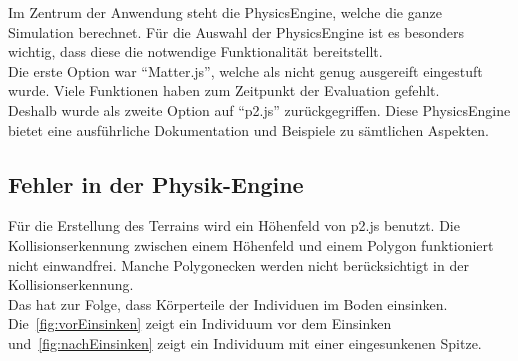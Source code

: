       Im Zentrum der Anwendung steht die \gls{PhysicsEngine}, welche die ganze Simulation berechnet.
      Für die Auswahl der \gls{PhysicsEngine} ist es besonders wichtig,
      dass diese die notwendige Funktionalität bereitstellt.
      \\
      Die erste Option war ``Matter.js'', welche als nicht genug ausgereift eingestuft wurde.
      Viele Funktionen haben zum Zeitpunkt der Evaluation gefehlt.
      \\
      Deshalb wurde als zweite Option auf ``p2.js'' zurückgegriffen.
      Diese \gls{PhysicsEngine} bietet eine ausführliche Dokumentation und Beispiele zu sämtlichen Aspekten.

    \subsection{Fehler in der Physik-Engine\label{sub:fehler}}

      Für die Erstellung des Terrains wird ein Höhenfeld von p2.js benutzt.
      Die Kollisionserkennung zwischen einem Höhenfeld und einem Polygon funktioniert nicht einwandfrei.
      Manche Polygonecken werden nicht berücksichtigt in der Kollisionserkennung.
      \\
      Das hat zur Folge, dass Körperteile der Individuen im Boden einsinken.
      Die~\vref{fig:vorEinsinken} zeigt ein Individuum vor dem Einsinken
      und~\vref{fig:nachEinsinken} zeigt ein Individuum mit einer eingesunkenen Spitze.

